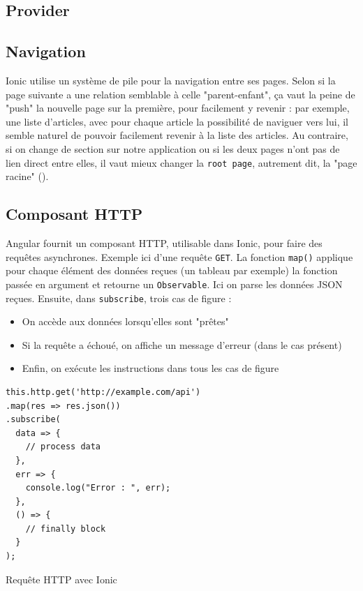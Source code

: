 \documentclass[a4paper, 12pt]{article}
\newenvironment{code}{\captionsetup{type=listing}}{}
\begin{document}
\subsection{Provider}

\subsection{Navigation}
Ionic utilise un système de pile pour la navigation entre ses pages. Selon si la page suivante a une relation 
semblable à celle "parent-enfant", ça vaut la peine de "push" la nouvelle page sur la première, pour facilement y 
revenir : par exemple, une liste d'articles, avec pour chaque article la possibilité de naviguer vers lui, il semble 
naturel de pouvoir facilement revenir à la liste des articles. Au contraire, si on change de section sur notre 
application ou si les deux pages n'ont pas de lien direct entre elles, il vaut mieux changer la \texttt{root page}, 
autrement dit, la "page racine" (\cite{ref50}).

\subsection{Composant HTTP}
Angular fournit un composant HTTP, utilisable dans Ionic, pour faire des requêtes asynchrones. Exemple ici d'une 
requête \texttt{GET}. La fonction \texttt{map()} applique pour chaque élément des données 
reçues (un tableau par exemple) la fonction passée en argument et retourne un \texttt{Observable}. 
Ici on parse les données JSON reçues. Ensuite, dans \texttt{subscribe}, trois cas de figure :
\begin{itemize}
    \item On accède aux données lorsqu'elles sont "prêtes"
    \item Si la requête a échoué, on affiche un message d'erreur (dans le cas présent)
    \item Enfin, on exécute les instructions dans tous les cas de figure
\end{itemize}
\begin{code}
    \begin{verbatim}
this.http.get('http://example.com/api')
.map(res => res.json())
.subscribe(
  data => {
    // process data
  },
  err => {
    console.log("Error : ", err);
  },
  () => {
    // finally block
  }
);
    \end{verbatim}
    \caption{Requête HTTP avec Ionic}
\end{code}
\end{document}
